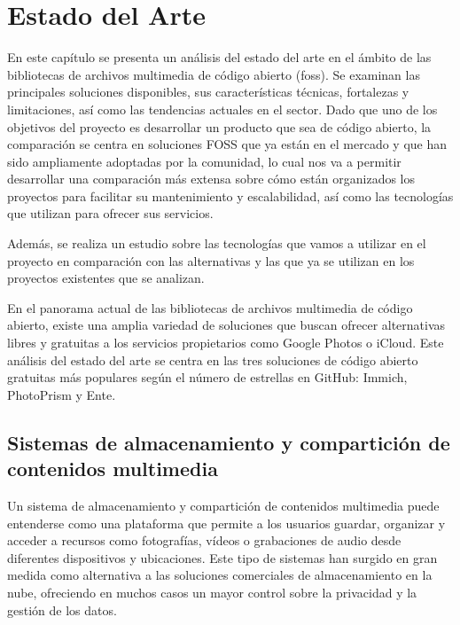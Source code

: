 \newpage
\chapter{Estado del Arte}
\label{ch:estado_del_arte}

En este capítulo se presenta un análisis del estado del arte en el ámbito de las bibliotecas de archivos multimedia de código abierto (\acrfull{foss}).
Se examinan las principales soluciones disponibles, sus características técnicas, fortalezas y limitaciones, así como las tendencias actuales en el sector.
Dado que uno de los objetivos del proyecto es desarrollar un producto que sea de código abierto, la comparación se centra en soluciones FOSS que ya están en el mercado y que han sido ampliamente adoptadas por la comunidad, lo cual nos va a permitir desarrollar una comparación más extensa sobre cómo están organizados los proyectos para facilitar su mantenimiento y escalabilidad, así como las tecnologías que utilizan para ofrecer sus servicios.

Además, se realiza un estudio sobre las tecnologías que vamos a utilizar en el proyecto en comparación con las alternativas y las que ya se utilizan en los proyectos existentes que se analizan.

En el panorama actual de las bibliotecas de archivos multimedia de código abierto, existe una amplia variedad de soluciones que buscan ofrecer alternativas libres y gratuitas a los servicios propietarios como Google Photos o iCloud. Este análisis del estado del arte se centra en las tres soluciones de código abierto gratuitas más populares según el número de estrellas en GitHub: Immich, PhotoPrism y Ente.

\section{Sistemas de almacenamiento y compartición de contenidos multimedia}

Un sistema de almacenamiento y compartición de contenidos multimedia puede entenderse como una plataforma que permite a los usuarios guardar, organizar y acceder a recursos como fotografías, vídeos o grabaciones de audio desde diferentes dispositivos y ubicaciones. Este tipo de sistemas han surgido en gran medida como alternativa a las soluciones comerciales de almacenamiento en la nube, ofreciendo en muchos casos un mayor control sobre la privacidad y la gestión de los datos.

